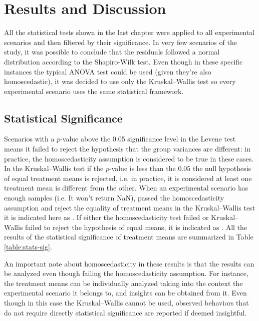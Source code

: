 \chapter{Results and Discussion}
\label{cap:results}

All the statistical tests shown in the last chapter were applied to all experimental scenarios and then filtered by their significance. In very few scenarios of the study, it was possible to conclude that the residuals followed a normal distribution according to the Shapiro-Wilk test. Even though in these specific instances the typical ANOVA test could be used (given they're also homoscedastic), it was decided to use only the Kruskal–Wallis test so every experimental scenario uses the same statistical framework.

\section{Statistical Significance}
\label{sec:stats-significance}

Scenarios with a $p$-value above the 0.05 significance level in the Levene test means it failed to reject the hypothesis that the group variances are different: in practice, the homoscedasticity assumption is considered to be true in these cases. In the Kruskal–Wallis test if the $p$-value is less than the $0.05$ the null hypothesis of equal treatment means is rejected, i.e. in practice, it is considered at least one treatment mean is different from the other. When an experimental scenario has enough samples (i.e. It won't return NaN), passed the homoscedasticity assumption and reject the equality of treatment means in the Kruskal–Wallis test it is indicated here as \ok. If either the homoscedasticity test failed or Kruskal–Wallis failed to reject the hypothesis of equal means, it is indicated as \notok. All the results of the statistical significance of treatment means are summarized in Table \ref{table:stats-sig}.

An important note about homoscedasticity in these results is that the results can be analyzed even though failing the homoscedasticity assumption. For instance, the treatment means can be individually analyzed taking into the context the experimental scenario it belongs to, and insights can be obtained from it. Even though in this case the Kruskal–Wallis cannot be used, observed behaviors that do not require directly statistical significance are reported if deemed insightful.

